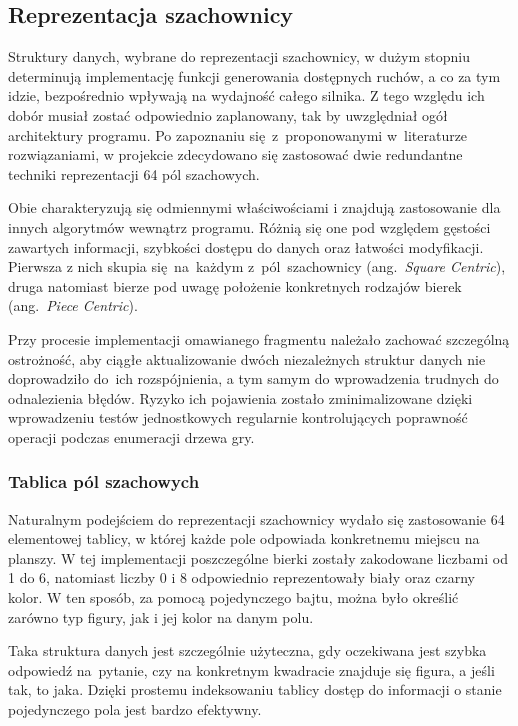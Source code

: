\subsection{Reprezentacja szachownicy}
\label{subsec:reprezentacja-szachownicy}

Struktury danych, wybrane do reprezentacji szachownicy, w dużym stopniu determinują implementację funkcji generowania dostępnych ruchów, a co za tym idzie, bezpośrednio wpływają na wydajność całego silnika.
Z tego względu ich dobór musiał zostać odpowiednio zaplanowany, tak by uwzględniał ogół architektury programu.
Po zapoznaniu się~z~proponowanymi w~literaturze rozwiązaniami, w projekcie zdecydowano się zastosować dwie redundantne techniki reprezentacji 64 pól szachowych.

Obie charakteryzują się odmiennymi właściwościami i znajdują zastosowanie dla innych algorytmów wewnątrz programu.
Różnią się one pod względem gęstości zawartych informacji, szybkości dostępu do danych oraz łatwości modyfikacji.
Pierwsza z nich skupia się~na~każdym z~pól~szachownicy (ang.~\emph{Square Centric}), druga natomiast bierze pod uwagę położenie konkretnych rodzajów bierek (ang.~\emph{Piece Centric}).

Przy procesie implementacji omawianego fragmentu należało zachować szczególną ostrożność, aby ciągłe aktualizowanie dwóch niezależnych struktur danych nie doprowadziło do~ich rozspójnienia, a tym samym do wprowadzenia trudnych do odnalezienia błędów.
Ryzyko ich pojawienia zostało zminimalizowane dzięki wprowadzeniu testów jednostkowych regularnie kontrolujących poprawność operacji podczas enumeracji drzewa gry.
\subsubsection{Tablica pól szachowych}

Naturalnym podejściem do reprezentacji szachownicy wydało się zastosowanie 64 elementowej tablicy, w której każde pole odpowiada konkretnemu miejscu na planszy.
W tej implementacji poszczególne bierki zostały zakodowane liczbami od 1 do 6, natomiast liczby 0 i 8 odpowiednio reprezentowały biały oraz czarny kolor.
W ten sposób, za pomocą pojedynczego bajtu, można było określić zarówno typ figury, jak i jej kolor na danym polu.

Taka struktura danych jest szczególnie użyteczna, gdy oczekiwana jest szybka odpowiedź na~pytanie, czy na konkretnym kwadracie znajduje się figura, a jeśli tak, to jaka.
Dzięki prostemu indeksowaniu tablicy dostęp do informacji o stanie pojedynczego pola jest bardzo efektywny.

